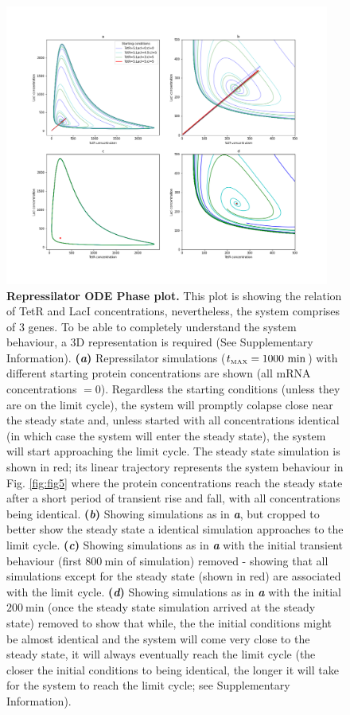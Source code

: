 \documentclass[runningheads,a4paper]{llncs}
\begin{document}
\begin{figure}
    \singlespacing
    \centering
    \includegraphics[width=0.95\textwidth]{suplementary_information_and_code/Task2_figure3.png}
    \caption{\textbf{Repressilator ODE Phase plot.} This plot is showing the relation of TetR and LacI concentrations, nevertheless, the system comprises of 3 genes. To be able to completely understand the system behaviour, a 3D representation is required (See Supplementary Information). \textbf{(\textit{a})} Repressilator simulations ($t_{\textrm{\tiny MAX}}=1000\ \textrm{min} $) with different starting protein concentrations are shown (all mRNA concentrations $= 0$). Regardless the starting conditions (unless they are on the limit cycle), the system will promptly colapse close near the steady state and, unless started with all concentrations identical (in which case the system will enter the steady state), the system will start approaching the limit cycle. The steady state simulation is shown in red; its linear trajectory represents the system behaviour in Fig. \ref{fig:fig5} where the protein concentrations reach the steady state after a short period of transient rise and fall, with all concentrations being identical. \textbf{(\textit{b})} Showing simulations as in \textit{\textbf{a}}, but cropped to better show the steady state a identical simulation approaches to the limit cycle. \textbf{(\textit{c})} Showing simulations as in \textit{\textbf{a}} with the initial transient behaviour (first $800\ \textrm{min}$ of simulation) removed - showing that all simulations except for the steady state (shown in red) are associated with the limit cycle. \textbf{(\textit{d})} Showing simulations as in \textit{\textbf{a}} with the initial $200\ \textrm{min}$ (once the steady state simulation arrived at the steady state) removed to show that while, the the initial conditions might be almost identical and the system will come very close to the steady state, it will always eventually reach the limit cycle (the closer the initial conditions to being identical, the longer it will take for the system to reach the limit cycle; see Supplementary Information).}
    \label{fig:fig6}
\end{figure}
\end{document}
